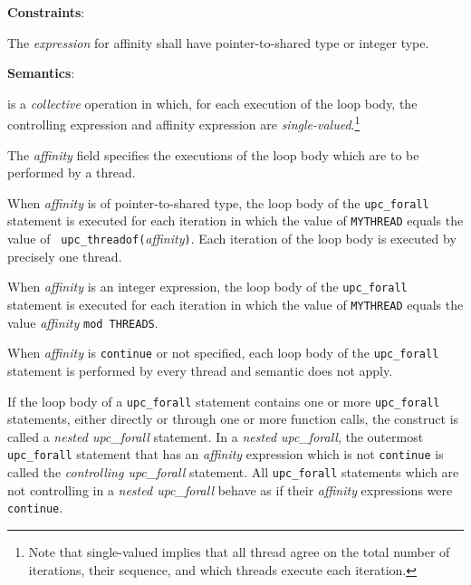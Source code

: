 {\bf Constraints}: 

\np The {\em expression} for affinity shall have pointer-to-shared
    type or integer type.

{\bf Semantics}: 

 is a {\em collective} operation in which, for each
    execution of the loop body, the controlling expression and
    affinity expression are {\em single-valued}.\footnote{Note that
    single-valued implies that all thread agree on the total number
    of iterations, their sequence, and which threads execute each
    iteration.}

\np The {\em affinity} field specifies the executions of the loop
    body which are to be performed by a thread.
    
\np When {\em affinity} is of pointer-to-shared type, the loop body of
    the {\tt upc\_forall} statement is executed for each iteration in
    which the value of {\tt MYTHREAD} equals the value of {\tt
    upc\_threadof(}{\em affinity}{\tt )}.  Each iteration of the  loop body is executed by
    precisely one thread.

\np When {\em affinity} is an integer expression, the loop body of
    the {\tt upc\_forall} statement is executed for each iteration in which
    the value of {\tt MYTHREAD} equals the value {\em affinity }{\tt mod THREADS}.

\np When {\em affinity} is {\tt continue} or not specified, each loop
    body of the {\tt upc\_forall} statement is performed by every thread and
    semantic  does not apply. 

\np If the loop body of a {\tt upc\_forall} statement
    contains one or more {\tt upc\_forall} statements, either directly
    or through one or more function calls, the construct is called a
    {\em nested upc\_forall} statement.  In a {\em nested upc\_forall},
    the outermost {\tt upc\_forall} statement that has an {\em
    affinity} expression which is not {\tt continue} is called the
    {\em controlling upc\_forall} statement.  All {\tt upc\_forall}
    statements which are not controlling in a {\em nested
    upc\_forall} behave as if their {\em affinity} expressions were
    {\tt continue}.


